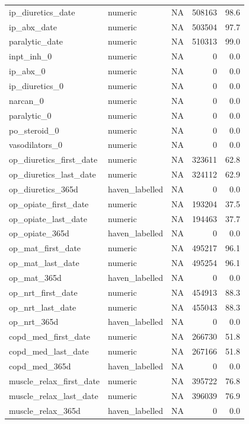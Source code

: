\documentclass[
  11pt,
  letterpaper,
  DIV=11,
  numbers=noendperiod]{scrartcl}
\begin{document}
\begin{longtable*}{llrrr}
ip\_diuretics\_date & numeric & NA & 508163 & 98.6\\
ip\_abx\_date & numeric & NA & 503504 & 97.7\\
paralytic\_date & numeric & NA & 510313 & 99.0\\
inpt\_inh\_0 & numeric & NA & 0 & 0.0\\
\addlinespace
ip\_abx\_0 & numeric & NA & 0 & 0.0\\
ip\_diuretics\_0 & numeric & NA & 0 & 0.0\\
narcan\_0 & numeric & NA & 0 & 0.0\\
paralytic\_0 & numeric & NA & 0 & 0.0\\
po\_steroid\_0 & numeric & NA & 0 & 0.0\\
\addlinespace
vasodilators\_0 & numeric & NA & 0 & 0.0\\
op\_diuretics\_first\_date & numeric & NA & 323611 & 62.8\\
op\_diuretics\_last\_date & numeric & NA & 324112 & 62.9\\
op\_diuretics\_365d & haven\_labelled & NA & 0 & 0.0\\
op\_opiate\_first\_date & numeric & NA & 193204 & 37.5\\
\addlinespace
op\_opiate\_last\_date & numeric & NA & 194463 & 37.7\\
op\_opiate\_365d & haven\_labelled & NA & 0 & 0.0\\
op\_mat\_first\_date & numeric & NA & 495217 & 96.1\\
op\_mat\_last\_date & numeric & NA & 495254 & 96.1\\
op\_mat\_365d & haven\_labelled & NA & 0 & 0.0\\
\addlinespace
op\_nrt\_first\_date & numeric & NA & 454913 & 88.3\\
op\_nrt\_last\_date & numeric & NA & 455043 & 88.3\\
op\_nrt\_365d & haven\_labelled & NA & 0 & 0.0\\
copd\_med\_first\_date & numeric & NA & 266730 & 51.8\\
copd\_med\_last\_date & numeric & NA & 267166 & 51.8\\
\addlinespace
copd\_med\_365d & haven\_labelled & NA & 0 & 0.0\\
muscle\_relax\_first\_date & numeric & NA & 395722 & 76.8\\
muscle\_relax\_last\_date & numeric & NA & 396039 & 76.9\\
muscle\_relax\_365d & haven\_labelled & NA & 0 & 0.0\\

\end{longtable*}
\end{document}
